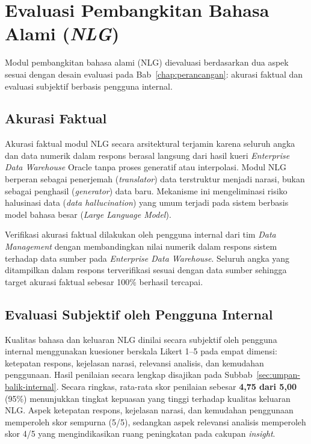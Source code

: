\section{Evaluasi Pembangkitan Bahasa Alami (\textit{NLG})}
\label{sec:eval-nlg}

Modul pembangkitan bahasa alami (NLG) dievaluasi berdasarkan dua aspek sesuai dengan desain evaluasi pada Bab~\ref{chap:perancangan}: akurasi faktual dan evaluasi subjektif berbasis pengguna internal.

\subsection{Akurasi Faktual}

Akurasi faktual modul NLG secara arsitektural terjamin karena seluruh angka dan data numerik dalam respons berasal langsung dari hasil kueri \textit{Enterprise Data Warehouse} Oracle tanpa proses generatif atau interpolasi. Modul NLG berperan sebagai penerjemah (\textit{translator}) data terstruktur menjadi narasi, bukan sebagai penghasil (\textit{generator}) data baru. Mekanisme ini mengeliminasi risiko halusinasi data (\textit{data hallucination}) yang umum terjadi pada sistem berbasis model bahasa besar (\textit{Large Language Model}).

Verifikasi akurasi faktual dilakukan oleh pengguna internal dari tim \textit{Data Management} dengan membandingkan nilai numerik dalam respons sistem terhadap data sumber pada \textit{Enterprise Data Warehouse}. Seluruh angka yang ditampilkan dalam respons terverifikasi sesuai dengan data sumber sehingga target akurasi faktual sebesar 100\% berhasil tercapai.

\subsection{Evaluasi Subjektif oleh Pengguna Internal}

Kualitas bahasa dan keluaran NLG dinilai secara subjektif oleh pengguna internal menggunakan kuesioner berskala Likert 1--5 pada empat dimensi: ketepatan respons, kejelasan narasi, relevansi analisis, dan kemudahan penggunaan. Hasil penilaian secara lengkap disajikan pada Subbab~\ref{sec:umpan-balik-internal}. Secara ringkas, rata-rata skor penilaian sebesar \textbf{4{,}75 dari 5{,}00} (95\%) menunjukkan tingkat kepuasan yang tinggi terhadap kualitas keluaran NLG. Aspek ketepatan respons, kejelasan narasi, dan kemudahan penggunaan memperoleh skor sempurna (5/5), sedangkan aspek relevansi analisis memperoleh skor 4/5 yang mengindikasikan ruang peningkatan pada cakupan \textit{insight}.

